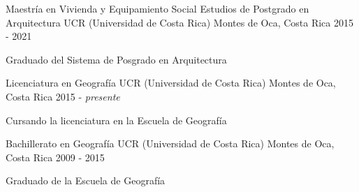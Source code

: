 

\begin{cventries}
  \cventry
  {Maestría en Vivienda y Equipamiento Social Estudios de Postgrado en
  Arquitectura} %
  {UCR (Universidad de Costa Rica)} %
  {Montes de Oca, Costa Rica} %
  {2015 - 2021} %
  {
    \begin{cvitems} %
      \item {Graduado del Sistema de Posgrado en Arquitectura}
    \end{cvitems}
  }

  \cventry
  {Licenciatura en Geografía} %
  {UCR (Universidad de Costa Rica)} %
  {Montes de Oca, Costa Rica} %
  {2015 - \textit{presente}} %
  {
    \begin{cvitems} %
      \item {Cursando la licenciatura en la Escuela de Geografía}
    \end{cvitems}
  }

  \cventry
    {Bachillerato en Geografía} %
    {UCR (Universidad de Costa Rica)} %
    {Montes de Oca, Costa Rica} %
    {2009 - 2015} %
    {
      \begin{cvitems} %
        \item {Graduado de la Escuela de Geografía}
      \end{cvitems}
    }

\end{cventries}

